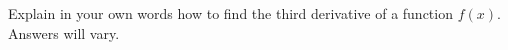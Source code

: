 {Explain in your own words how to find the third derivative of a function $f(x)$.
}
{Answers will vary.
}
